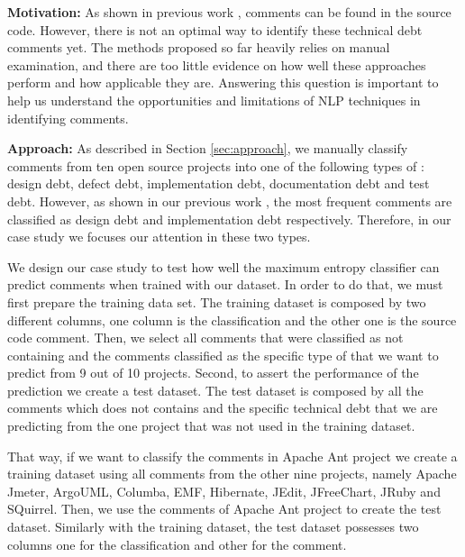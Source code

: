 \vspace{3mm}
\noindent\rqi
\vspace{3mm}

\noindent \textbf{Motivation:} As shown in previous work \cite{Potdar2014ICSME, Maldonado2015MTD}, \SATD comments can be found in the source code. However, there is not an optimal way to identify these technical debt comments yet. The methods proposed so far heavily relies on manual examination, and there are too little evidence on how well these approaches perform and how applicable they are. Answering this question is important to help us understand the opportunities and limitations of NLP techniques in identifying \SATD comments. 

\vspace{1mm}
\noindent \textbf{Approach:} As described in Section \ref{sec:approach}, we manually classify comments from ten open source projects into one of the following types of \SATD: design debt, defect debt, implementation debt, documentation debt and test debt. However, as shown in our previous work \cite{Maldonado2015MTD}, the most frequent \SATD comments are classified as design debt and implementation debt respectively. Therefore, in our case study we focuses our attention in these two \SATD types. 

We design our case study to test how well the maximum entropy classifier can predict \SATD comments when trained with our dataset. In order to do that, we must first prepare the training data set. The training dataset is composed by two different columns, one column is the classification and the other one is the source code comment. Then, we select all comments that were classified as not containing \SATD and the comments classified as the specific type of \SATD  that we want to predict from 9 out of 10 projects. Second, to assert the performance of the prediction we create a test dataset. The test dataset is composed by all the comments which does not contains \SATD and the specific technical debt that we are predicting from the one project that was not used in the training dataset. 

That way, if we want to classify the \SATD comments in Apache Ant project we create a training dataset using all comments from the other nine projects, namely Apache Jmeter, ArgoUML, Columba, EMF, Hibernate, JEdit, JFreeChart, JRuby and SQuirrel. Then, we use the comments of Apache Ant project to create the test dataset. Similarly with the training dataset, the test dataset possesses two columns one for the classification and other for the comment. 

